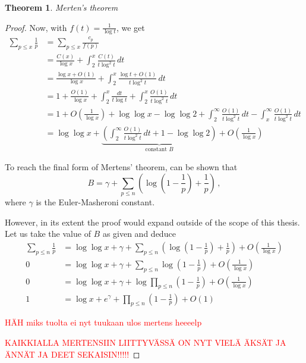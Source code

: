 \documentclass{article}
\theoremstyle{definition}
\newtheorem{theorem}[subsection]{Theorem}
\begin{document}
\begin{theorem}{\emph{Merten's theorem}}
\begin{proof}
Now, with $f(t)=\frac{1}{\log t}$, we get
\begin{align*}
    \sum_{p\leq x} \frac{1}{p} & = \sum_{p\leq x} \frac{c_p}{f(p)}\\
    & = \frac{C(x)}{\log x} + \int_2^x \frac{C(t)}{t\log^2 t}\,dt\\
    & = \frac{\log x + O(1)}{\log x} + \int_2^x \frac{\log t + O(1)}{t\log^2 t}\,dt\\
    & = 1 + \frac{O(1)}{\log x} + \int_2^x \frac{dt}{t \log t} + \int_2^x \frac{O(1)}{t \log^2 t}\,dt\\
    & = 1 + O\left(\frac{1}{\log x}\right) + \log\log x - \log\log 2 + \int_2^\infty \frac{O(1)}{t \log^2 t}\,dt - \int_x^\infty \frac{O(1)}{t \log^2 t}\,dt\\
    & = \log\log x + \underbrace{\left(\int_2^\infty \frac{O(1)}{t \log^2 t}\,dt + 1 - \log \log 2\right)}_\text{constant $B$} + O\left(\frac{1}{\log x}\right)
\end{align*}

To reach the final form of Mertens' theorem, can be shown \cite{HardyWright} that
\begin{equation*}
    B = \gamma + \sum_{p\leq n} \left(\log \left(1-\frac{1}{p}\right)+\frac{1}{p}\right)\,,
\end{equation*}
where $\gamma$ is the Euler-Masheroni constant.

However, in its extent the proof would expand outside of the scope of this thesis. Let us take the value of $B$ as given and deduce
\begin{align*}
\sum_{p\leq n} \frac{1}{p} & = \log\log x + \gamma + \sum_{p\leq n} \left(\log \left(1-\frac{1}{p}\right)+\frac{1}{p}\right) + O\left(\frac{1}{\log x}\right)\\
0 & = \log\log x + \gamma + \sum_{p\leq n} \log \left(1-\frac{1}{p}\right) + O\left(\frac{1}{\log x}\right)\\
0 & = \log\log x + \gamma + \log \prod_{p\leq n} \left(1-\frac{1}{p}\right) + O\left(\frac{1}{\log x}\right)\\
1 & = \log x + e^\gamma + \prod_{p\leq n} \left(1-\frac{1}{p}\right) + O(1)
\end{align*}

\textcolor{red}{HÄH miks tuolta ei nyt tuukaan ulos mertens heeeelp}

\textcolor{red}{KAIKKIALLA MERTENSIIN LIITTYVÄSSÄ ON NYT VIELÄ ÄKSÄT JA ÄNNÄT JA DEET SEKAISIN!!!!!}


\end{proof}

\end{theorem}
\end{document}
